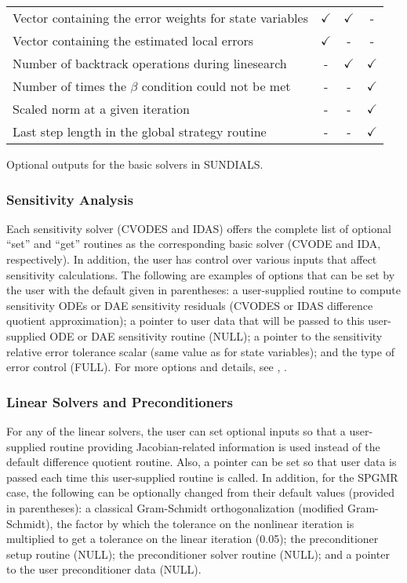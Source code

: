 \begin{acmtable}{327pt}
\begin{tabular}{p{2.75in} c c c }
Vector containing the error weights for state variables & $\checkmark$ & $\checkmark$ & - \\
Vector containing the estimated local errors & $\checkmark$ & - & - \\
Number of backtrack operations during linesearch & - & $\checkmark$ & $\checkmark$ \\
Number of times the $\beta$ condition could not be met & - & - & $\checkmark$ \\
Scaled norm at a given iteration & - & - & $\checkmark$ \\
Last step length in the global strategy routine & - & - & $\checkmark$ \\
\end{tabular}
\caption{Optional outputs for the basic solvers in SUNDIALS.}
\label{t:optional_output}
\end{acmtable}

\subsubsection*{Sensitivity Analysis}

Each sensitivity solver (CVODES and IDAS) offers the complete list of
optional ``set'' and ``get'' routines as the corresponding basic solver (CVODE
and IDA, respectively). In addition, the user has control over various
inputs that affect sensitivity calculations. 
The following are examples of options that can be set by the user
with the default given in parentheses: a user-supplied routine
to compute sensitivity ODEs or DAE sensitivity residuals (CVODES or
IDAS difference quotient approximation); a pointer to user data that
will be passed to this user-supplied ODE or DAE sensitivity routine (NULL); a
pointer to the sensitivity relative error tolerance scalar (same value as
for state variables); and the type of error control (FULL).
For more options and details, see \cite{SeHi:03}, \cite{HiSe:04cvodes}.

\subsubsection*{Linear Solvers and Preconditioners}

For any of the linear solvers, the user can set optional inputs so 
that a user-supplied routine providing Jacobian-related information
is used instead of the default difference quotient routine. 
Also, a pointer can be set so that user data is passed each time this
user-supplied routine is called. In addition, for the SPGMR case,
the following can be optionally changed from their default values
(provided in parentheses): a classical Gram-Schmidt orthogonalization 
(modified Gram-Schmidt), the factor by which the tolerance on the
nonlinear iteration is multiplied to get a tolerance on the linear
iteration (0.05); the preconditioner setup routine (NULL); the
preconditioner solver routine (NULL); and a pointer to the user
preconditioner data (NULL).

